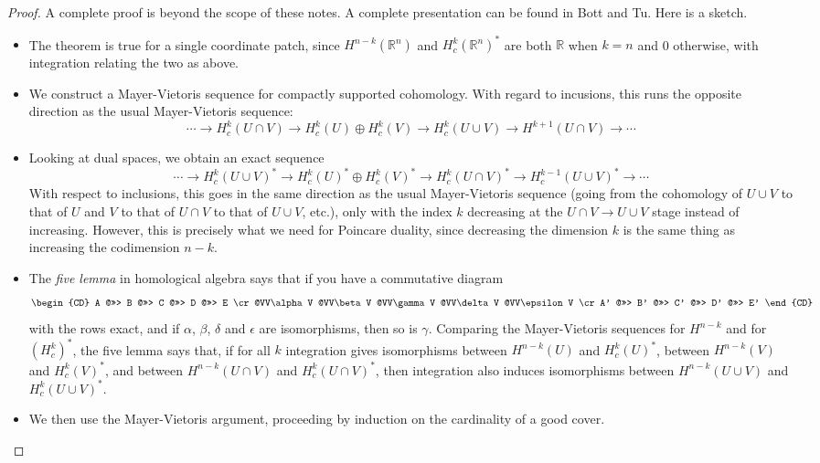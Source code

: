 \documentclass[12pt]{amsbook}
\newcommand{\R}{{\mathbb R}}
\theoremstyle{definition}
\begin{document}
\begin{proof} A complete proof is beyond the scope of these
  notes. A complete presentation can be found in Bott and Tu.  Here is
  a sketch.
\begin{itemize}
\item The theorem is true for a single coordinate patch, since
  $H^{n-k}(\R^n)$ and $H^k_c(\R^n)^*$ are both $\R$ when $k=n$ and 0
  otherwise, with integration relating the two as above.
\item We construct a Mayer-Vietoris sequence for compactly supported cohomology. With regard to incusions, 
this runs the opposite direction 
as the usual Mayer-Vietoris sequence:
$$ \cdots \rightarrow H^k_c(U\cap V) \rightarrow H^k_c(U) \oplus H^k_c(V) \rightarrow H^k_c(U \cup V) \rightarrow H^{k+1}(U \cap V) \rightarrow \cdots$$
\item Looking at dual spaces,  we obtain an exact sequence 
$$ \cdots \rightarrow H^k_c(U \cup V)^* \rightarrow H^k_c(U)^* \oplus H^k_c(V)^* \rightarrow H^k_c(U\cap V)^* 
\rightarrow H^{k-1}_c(U \cup V)^* \rightarrow \cdots $$ With respect
to inclusions, this goes in the same direction as the usual
Mayer-Vietoris sequence (going from the cohomology of $U\cup V$ to
that of $U$ and $V$ to that of $U \cap V$ to that of $U \cup V$, etc.), only
with the index $k$ decreasing at the $U \cap V \to U \cup V$ stage
instead of increasing. However, this is precisely what we need for Poincare
duality, since decreasing the dimension $k$ is the same thing as
increasing the codimension $n-k$.
\item The {\em five lemma} in homological algebra says that if you have a commutative diagram
$$ \begin{CD}
A @>>> B @>>> C @>>> D @>>> E \cr  
@VV\alpha V @VV\beta V @VV\gamma V @VV\delta V @VV\epsilon V \cr 
A' @>>> B' @>>> C' @>>> D' @>>> E' 
\end{CD}
$$
with the rows exact, and if $\alpha$, $\beta$, $\delta$ and $\epsilon$
are isomorphisms, then so is $\gamma$. Comparing the Mayer-Vietoris
sequences for $H^{n-k}$ and for $(H^k_c)^*$, the five lemma says that,
if for all $k$ integration gives isomorphisms between $H^{n-k}(U)$ and
$H^k_c(U)^*$, between $H^{n-k}(V)$ and $H^k_c(V)^*$, and between
$H^{n-k}(U\cap V)$ and $H^k_c(U\cap V)^*$, then
integration also induces isomorphisms between $H^{n-k}(U\cup V)$ and
$H^k_c(U\cup V)^*$.
 \item We then use the Mayer-Vietoris argument, proceeding by 
induction on the cardinality of a good cover. 
 \end{itemize}
 \end{proof}
 
\end{document}

